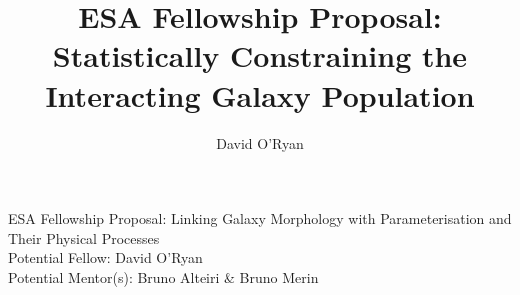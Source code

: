 \documentclass[11pt,usenatbib]{article}
\title{ESA Fellowship Proposal: Statistically Constraining the Interacting Galaxy Population}
\author{David O'Ryan}
\begin{document}
    \begin{center}
        \large{{ESA Fellowship Proposal: Linking Galaxy Morphology with Parameterisation and Their Physical Processes \\
        Potential Fellow: David O'Ryan \\
        Potential Mentor(s): Bruno Alteiri \& Bruno Merin}}
    \end{center}
    
\end{document}
